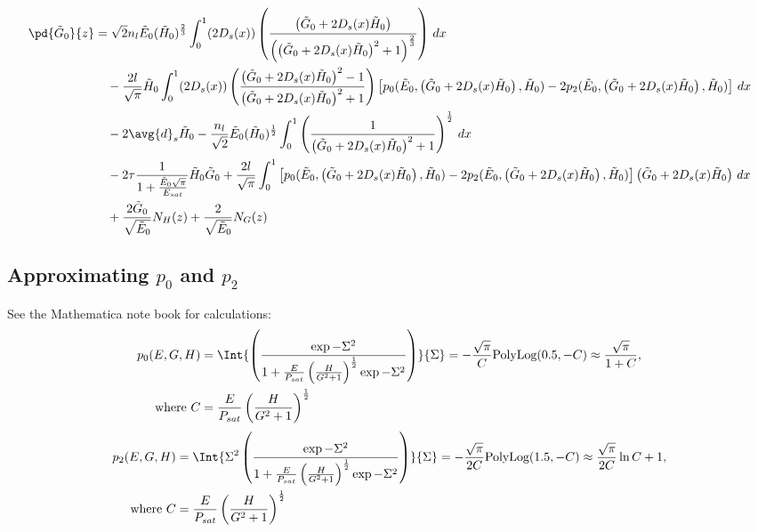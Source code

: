 \begin{equation}
\begin{split}
\pd{\tilde{G}_0}{z} &= \sqrt{2}n_{l}\tilde{E}_0 (\tilde{H}_0)^{\frac{2}{3}}  \int_{0}^{1} (2 D_s(x)) \left(\frac{\left(\tilde{G}_0+ 2 D_s(x) \tilde{H}_0\right)}{\left(\left(\tilde{G}_0+ 2 D_s(x) \tilde{H}_0\right)^2+1\right)^{\frac{2}{3}}}\right) \,dx  \\
&\quad - \frac{2l}{\sqrt{\pi}}\tilde{H}_0  \int_{0}^{1} (2 D_s(x)) \left(\frac{\left(\tilde{G}_0+ 2 D_s(x) \tilde{H}_0\right)^2-1}{\left(\tilde{G}_0+ 2 D_s(x) \tilde{H}_0\right)^2+1}\right) \left[p_0(\tilde{E}_0,\left(\tilde{G}_0 + 2 D_s(x) \tilde{H}_0\right),\tilde{H}_0) - 2p_2(\tilde{E}_0,\left(\tilde{G}_0+ 2 D_s(x) \tilde{H}_0\right),\tilde{H}_0)\right] \, dx\\
&\quad - 2 \avg{d}_s \tilde{H}_0 - \frac{n_{l}}{\sqrt{2}}\tilde{E}_0 (\tilde{H}_0)^{\frac{1}{2}} \int_{0}^{1} \left(\frac{1}{\left(\tilde{G}_0+ 2 D_s(x) \tilde{H}_0\right)^2+1}\right)^{\frac{1}{2}} \, dx\\
&\quad - 2\tau\frac{1}{1+\frac{\tilde{E}_0 \sqrt{\pi}}{E_{sat}}}\tilde{H}_0 \tilde{G}_0 + \frac{2l}{\sqrt{\pi}} \int_{0}^{1}\left[p_0(\tilde{E}_0,\left(\tilde{G}_0+ 2 D_s(x) \tilde{H}_0\right),\tilde{H}_0) - 2p_2(\tilde{E}_0,\left(\tilde{G}_0+ 2 D_s(x) \tilde{H}_0\right),\tilde{H}_0)\right]\left(\tilde{G}_0+ 2 D_s(x) \tilde{H}_0\right) \, dx\\
&\quad + \frac{2\tilde{G}_0}{\sqrt{\tilde{E}_0}} N_H(z) + \frac{2}{\sqrt{\tilde{E}_0}} N_G(z) \\
\end{split}
\end{equation}


\subsection{Approximating $p_0$ and $p_2$}
See the Mathematica note book for calculations:
\begin{equation}
\begin{split}
p_0(E,G,H) &= \Int{\left(\frac{ \exp{-\Sigma^2} }{1+\frac{E}{P_{sat}}\left(\frac{H}{G^2+1}\right)^{\frac{1}{2}}\exp{-\Sigma^2}}\right)}{\Sigma} = -\frac{\sqrt{\pi}}{C} \mbox{PolyLog}(0.5,-C) \approx \frac{\sqrt{\pi}}{1+C},\\
\mbox{ where } C &= \frac{E}{P_{sat}}\left(\frac{H}{G^2+1}\right)^{\frac{1}{2}} \\
\end{split}
\end{equation}
\begin{equation}
\begin{split}
p_2(E,G,H) &= \Int{\Sigma^2 \left(\frac{ \exp{-\Sigma^2} }{1+\frac{E}{P_{sat}}\left(\frac{H}{G^2+1}\right)^{\frac{1}{2}}\exp{-\Sigma^2}}\right)}{\Sigma} = -\frac{\sqrt{\pi}}{2C} \mbox{PolyLog}(1.5,-C) \approx \frac{\sqrt{\pi}}{2C}\ln{C+1},\\
\mbox{ where } C &= \frac{E}{P_{sat}}\left(\frac{H}{G^2+1}\right)^{\frac{1}{2}} \\
\end{split}
\end{equation}

